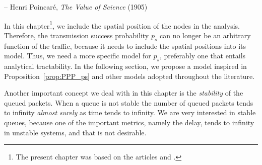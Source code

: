 %
{-- Henri Poincar\'e, \textit{The Value of Science} (1905)}

In this chapter\footnote{The present chapter was based on the articles \cite{dester2018} and \cite{dester2021part}.}, we include the spatial position of the nodes in the analysis.
%
Therefore, the transmission success probability $p_s$ can no longer be an arbitrary function of the traffic, because it needs to include the spatial positions into its model.
%
Thus, we need a more specific model for $p_s$, preferably one that entails analytical tractability.
%
In the following section, we propose a model inspired in Proposition~\ref{prop:PPP_ps} and other models adopted throughout the literature.

Another important concept we deal with in this chapter is the \textit{stability} of the queued packets. When a queue is not stable the number of queued packets tends to infinity \textit{almost surely} as time tends to infinity.
%
We are very interested in stable queues, because one of the important metrics, namely the delay, tends to infinity in unstable systems, and that is not desirable.

